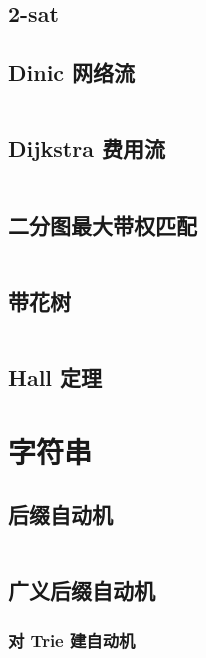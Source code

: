 \documentclass[a4paper, twoside]{article}
\begin{document}
\begin{multicols}{2}
			\subsection{2-sat}
			
			\subsection{Dinic 网络流}
				\inputminted{cpp}{../src-midori/graph/dinic.cpp}
			
			\subsection{Dijkstra 费用流}
				\inputminted{cpp}{../src-midori/graph/dijkstra费用流.cpp}
			
			\subsection{二分图最大带权匹配}
				\inputminted{cpp}{../src-midori/graph/二分图最大带权匹配.cpp}
			
			\subsection{带花树}
				\inputminted{cpp}{../src-midori/graph/带花树.cpp}
			
			\subsection{Hall 定理}
				
			

		\newpage
		\section{字符串}

			\subsection{后缀自动机}
				\inputminted{cpp}{../src-midori/string/后缀自动机.cpp}
			
			\subsection{广义后缀自动机}
				\subsubsection{对 Trie 建自动机}
					

\end{multicols}
\end{document}

